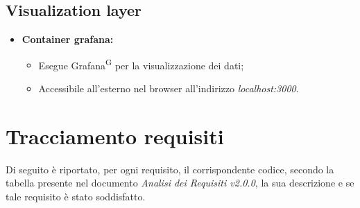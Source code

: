 \documentclass[8pt]{article}
\newcommand{\glossterm}[1]{#1\textsuperscript{G}} %
\begin{document}
\subsection{Visualization layer}
\begin{itemize}
	\setlength\itemsep{0em}
    \item \textbf{Container grafana:}
    \begin{itemize}
	\setlength\itemsep{0em}
        \item Esegue \glossterm{Grafana} per la visualizzazione dei dati;
        \item Accessibile all'esterno nel browser all'indirizzo \textit{localhost:3000}.
    \end{itemize}
\end{itemize}
\newpage
\section{Tracciamento requisiti}\label{sec:trac}
Di seguito è riportato, per ogni requisito, il corrispondente codice, secondo la tabella presente nel documento \textit{Analisi dei Requisiti v2.0.0}, la sua descrizione e se tale requisito è stato soddisfatto.
\setcounter{row}{0}
\newcommand{\rownumber}{\stepcounter{row}\arabic{row}}
\renewcommand{\arraystretch}{2.5}
\end{document}
